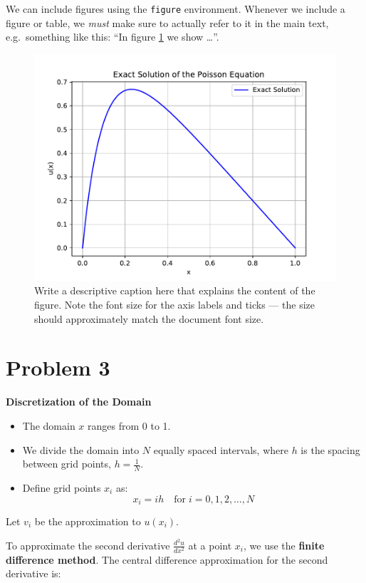 \documentclass[english,notitlepage]{revtex4-1}  %
\begin{document}
We can include figures using the \texttt{figure} environment. Whenever we include a figure or table, we \textit{must} make sure to actually refer to it in the main text, e.g.\ something like this: ``In figure \ref{fig:rel_err} we show \ldots''. 
\begin{figure}%
    \centering %
    \includegraphics[scale=0.75]{problem2/poisson_solution_plot.pdf} %
    \caption{Write a descriptive caption here that explains the content of the figure. Note the font size for the axis labels and ticks --- the size should approximately match the document font size.}
    \label{fig:rel_err}
\end{figure}

\section*{Problem 3}
\textbf{Discretization of the Domain}

\begin{itemize}
    \item The domain $x$ ranges from 0 to 1.
    \item We divide the domain into $N$ equally spaced intervals, where $h$ is the spacing between grid points, $h = \frac{1}{N}$.
    \item Define grid points $x_i$ as:
    $$ x_i = i h \quad \text{for} \; i = 0, 1, 2, \ldots, N $$
\end{itemize}

Let $v_i$ be the approximation to $u(x_i)$.

To approximate the second derivative $\frac{d^2 u}{dx^2}$ at a point $x_i$, we use the \textbf{finite difference method}. The central difference approximation for the second derivative is:
\end{document}
